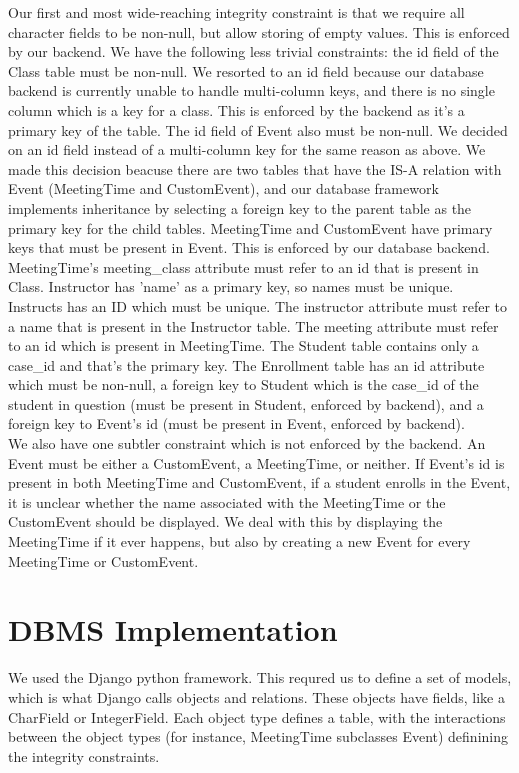 \documentclass[pdftex,12pt,letter]{article}
\begin{document}
Our first and most wide-reaching integrity constraint is that we require all character fields to be non-null, but allow storing of empty values.  This is enforced by our backend.
We have the following less trivial constraints:  the id field of the Class table must be non-null.  We resorted to an id field because our database backend is currently unable to handle multi-column keys, and there is no single column which is a key for a class.  This is enforced by the backend as it's a primary key of the table.  
The id field of Event also must be non-null.  We decided on an id field instead of a multi-column key for the same reason as above.  We made this decision beacuse there are two tables that have the IS-A relation with Event (MeetingTime and CustomEvent), and our database framework implements inheritance by selecting a foreign key to the parent table as the primary key for the child tables.
MeetingTime and CustomEvent have primary keys that must be present in Event.  This is enforced by our database backend.  MeetingTime's meeting\_class attribute must refer to an id that is present in Class.
Instructor has 'name' as a primary key, so names must be unique.
Instructs has an ID which must be unique.  The instructor attribute must refer to a name that is present in the Instructor table.  The meeting attribute must refer to an id which is present in MeetingTime.
The Student table contains only a case\_id and that's the primary key.  The Enrollment table has an id attribute which must be non-null, a foreign key to Student which is the case\_id of the student in question (must be present in Student, enforced by backend), and a foreign key to Event's id (must be present in Event, enforced by backend).\\

We also have one subtler constraint which is not enforced by the backend.  An Event must be either a CustomEvent, a MeetingTime, or neither.  If Event's id is present in both MeetingTime and CustomEvent, if a student enrolls in the Event, it is unclear whether the name associated with the MeetingTime or the CustomEvent should be displayed.  We deal with this by displaying the MeetingTime if it ever happens, but also by creating a new Event for every MeetingTime or CustomEvent.\\

\section{DBMS Implementation}
We used the Django python framework.  This requred us to define a set of models, which is what Django calls objects and relations.  These objects have fields, like a CharField or IntegerField.  Each object type defines a table, with the interactions between the object types (for instance, MeetingTime subclasses Event) definining the integrity constraints.  
\end{document}
